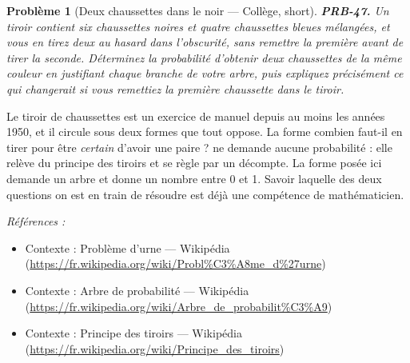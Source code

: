 \documentclass[11pt]{article}
\newtheorem{problem}{Problème}
\newenvironment{refs}{\par\small\noindent\emph{Références :}\begin{itemize}\setlength\itemsep{0pt}}{\end{itemize}\normalsize}
\begin{document}
\bigskip

\begin{problem}[{Deux chaussettes dans le noir --- Collège, short}]
\textbf{PRB-47.} Un tiroir contient six chaussettes noires et quatre
chaussettes bleues mélangées, et vous en tirez deux au hasard dans l'obscurité, sans remettre la
première avant de tirer la seconde. Déterminez la probabilité d'obtenir deux chaussettes de la même
couleur en justifiant chaque branche de votre arbre, puis expliquez précisément ce qui changerait
si vous remettiez la première chaussette dans le tiroir.
\end{problem}

\noindent Le tiroir de chaussettes est un exercice de manuel depuis au moins les années
1950, et il circule sous deux formes que tout oppose. La forme \og{} combien faut-il en tirer pour être
\textit{certain} d'avoir une paire ? \fg{} ne demande aucune probabilité : elle relève du principe des
tiroirs et se règle par un décompte. La forme posée ici demande un arbre et donne un nombre entre 0
et 1. Savoir laquelle des deux questions on est en train de résoudre est déjà une compétence de
mathématicien.

\begin{refs}
\item Contexte : Problème d'urne --- Wikipédia (\url{https://fr.wikipedia.org/wiki/Probl%C3%A8me_d%27urne})
\item Contexte : Arbre de probabilité --- Wikipédia (\url{https://fr.wikipedia.org/wiki/Arbre_de_probabilit%C3%A9})
\item Contexte : Principe des tiroirs --- Wikipédia (\url{https://fr.wikipedia.org/wiki/Principe_des_tiroirs})
\end{refs}

\bigskip
\end{document}
